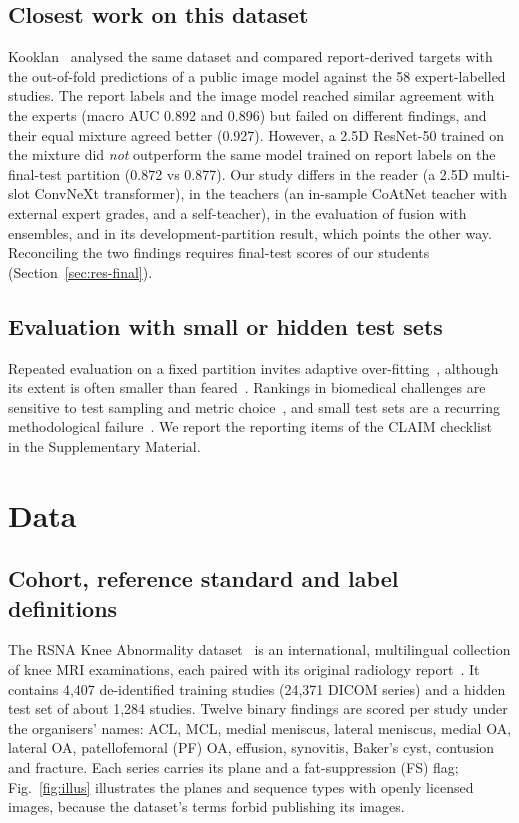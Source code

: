 \documentclass{ieeeaccess}
\begin{document}
\subsection{Closest work on this dataset}
Kooklan~\cite{kooklan2026gap} analysed the same dataset and compared report-derived targets with the out-of-fold
predictions of a public image model against the 58 expert-labelled studies. The report labels and the image model reached
similar agreement with the experts (macro AUC 0.892 and 0.896) but failed on different findings, and their equal mixture
agreed better (0.927). However, a 2.5D ResNet-50 trained on the mixture did \emph{not} outperform the same model trained on
report labels on the final-test partition (0.872 vs 0.877). Our study differs in the reader (a 2.5D multi-slot ConvNeXt
transformer), in the teachers (an in-sample CoAtNet teacher with external expert grades, and a self-teacher), in the
evaluation of fusion with ensembles, and in its development-partition result, which points the other way. Reconciling
the two findings requires final-test scores of our students (Section~\ref{sec:res-final}).

\subsection{Evaluation with small or hidden test sets}
Repeated evaluation on a fixed partition invites adaptive over-fitting~\cite{blum2015ladder}, although its extent is often
smaller than feared~\cite{roelofs2019meta}. Rankings in biomedical challenges are sensitive to test sampling and metric
choice~\cite{maierhein2018rankings}, and small test sets are a recurring methodological
failure~\cite{varoquaux2022failures}. We report the reporting items of the CLAIM checklist~\cite{claim2024} in the
Supplementary Material.

\section{Data}
\label{sec:data}

\subsection{Cohort, reference standard and label definitions}
The RSNA Knee Abnormality dataset~\cite{rsna2026knee} is an international, multilingual collection of knee MRI
examinations, each paired with its original radiology report~\cite{chen2026overview}. It contains 4,407 de-identified
training studies (24,371 DICOM series) and a hidden test set of about 1,284 studies. Twelve binary findings are scored
per study under the organisers' names: ACL, MCL, medial meniscus, lateral meniscus, medial OA, lateral OA,
patellofemoral (PF) OA, effusion, synovitis, Baker's cyst, contusion and fracture. Each series carries its plane and a
fat-suppression (FS) flag; Fig.~\ref{fig:illus} illustrates the planes and sequence types with openly licensed images,
because the dataset's terms forbid publishing its images.
\end{document}
